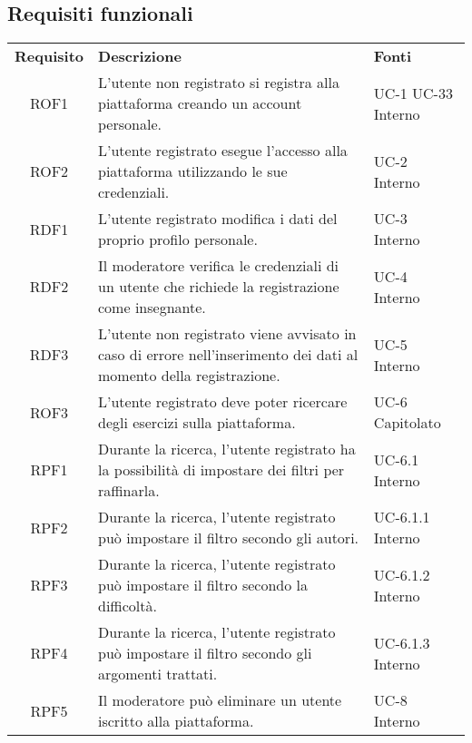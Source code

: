 \subsection{Requisiti funzionali}
\begin{tabularx}{\textwidth}{| c | p{10cm} | X |}
		\rowcolor{LightBlue}
		\color{white}\bfseries Requisito & \color{white}\bfseries Descrizione & \color{white}\bfseries Fonti\\[0.25cm]
		ROF1 & L'utente non registrato si registra alla piattaforma creando un account personale. & UC-1 \newline UC-33 \newline Interno\\
		ROF2 & L'utente registrato esegue l'accesso alla piattaforma utilizzando le sue credenziali. & UC-2 \newline Interno\\
		RDF1 & L'utente registrato modifica i dati del proprio profilo personale. & UC-3 \newline Interno\\
		RDF2 & Il moderatore verifica le credenziali di un utente che richiede la registrazione come insegnante. & UC-4 \newline Interno\\
		RDF3 & L'utente non registrato viene avvisato in caso di errore nell'inserimento dei dati al momento della registrazione. & UC-5 \newline Interno\\
		ROF3 & L'utente registrato deve poter ricercare degli esercizi sulla piattaforma. & UC-6 \newline Capitolato\\
		RPF1 & Durante la ricerca, l'utente registrato ha la possibilità di impostare dei filtri per raffinarla. & UC-6.1 \newline Interno\\
		RPF2 & Durante la ricerca, l'utente registrato può impostare il filtro secondo gli autori. & UC-6.1.1 \newline Interno\\
		RPF3 & Durante la ricerca, l'utente registrato può impostare il filtro secondo la difficoltà. & UC-6.1.2 \newline Interno\\
		RPF4 & Durante la ricerca, l'utente registrato può impostare il filtro secondo gli argomenti trattati. & UC-6.1.3 \newline Interno\\
		RPF5 & Il moderatore può eliminare un utente iscritto alla piattaforma. & UC-8 \newline Interno\\

\end{tabularx}
